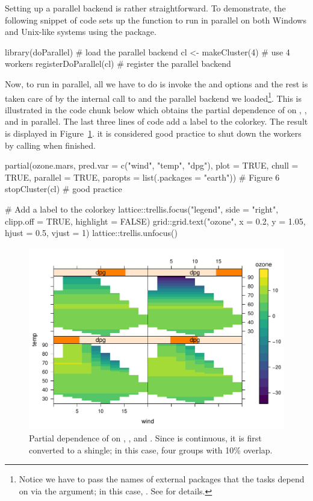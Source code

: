 Setting up a parallel backend is rather straightforward. To demonstrate, the following snippet of code sets up the  function to run in parallel on both Windows and Unix-like systems using the  package.
\begin{example}
library(doParallel)  # load the parallel backend
cl <- makeCluster(4)  # use 4 workers
registerDoParallel(cl)  # register the parallel backend
\end{example}
Now, to run  in parallel, all we have to do is invoke the  and  options and the rest is taken care of by the internal call to  and the parallel backend we loaded\footnote{Notice we have to pass the names of external packages that the tasks depend on via the  argument; in this case, . See  for details.}. This is illustrated in the code chunk below which obtains the partial dependence of  on , , and  in parallel. The last three lines of code add a label to the colorkey. The result is displayed in Figure~\ref{fig:partial_par}.  it is considered good practice to shut down the workers by calling  when finished.
\begin{example}
partial(ozone.mars, pred.var = c("wind", "temp", "dpg"), plot = TRUE,
        chull = TRUE, parallel = TRUE, paropts = list(.packages = "earth"))  # Figure 6
stopCluster(cl)  # good practice

# Add a label to the colorkey
lattice::trellis.focus("legend", side = "right", clipp.off = TRUE, highlight = FALSE)
grid::grid.text("ozone", x = 0.2, y = 1.05, hjust = 0.5, vjust = 1)
lattice::trellis.unfocus()
\end{example}

\begin{figure}[!htbp]
  \centering
  \includegraphics[width=0.8\linewidth]{partial_par}
  \caption{Partial dependence of  on , , and . Since  is continuous, it is first converted to a shingle; in this case, four groups with 10\% overlap.}
  \label{fig:partial_par}
\end{figure}

